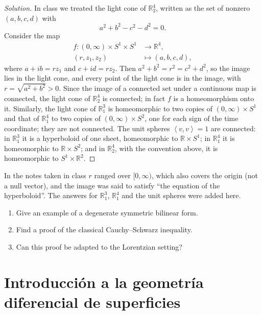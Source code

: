 \begin{proof}[Solution]
In class we treated the light cone of
$\mathbb{R}^4_2$, written as the set of
nonzero $(a,b,c,d)$ with
$$
a^2+b^2-c^2-d^2=0 .
$$
Consider the map
$$
\begin{aligned}
f\colon (0,\infty)\times S^1\times S^1
&\longrightarrow\mathbb{R}^4,\\
(r,z_1,z_2)&\longmapsto(a,b,c,d),
\end{aligned}
$$
where $a+ib=rz_1$ and $c+id=rz_2$. Then
$a^2+b^2=r^2=c^2+d^2$, so the image lies in
the light cone, and every point of the
light cone is in the image, with
$r=\sqrt{a^2+b^2}>0$. Since the image of a
connected set under a continuous map is
connected, the light cone of
$\mathbb{R}^4_2$ is connected; in fact $f$
is a homeomorphism onto it. Similarly, the
light cone of $\mathbb{R}^3_1$ is
homeomorphic to two copies of
$(0,\infty)\times S^1$ and that of
$\mathbb{R}^4_1$ to two copies of
$(0,\infty)\times S^2$, one for each sign
of the time coordinate; they are not
connected. The unit spheres
$\left\langle{} v,v \right\rangle{}=1$ are
connected: in $\mathbb{R}^3_1$ it is a
hyperboloid of one sheet, homeomorphic to
$\mathbb{R}\times S^1$; in
$\mathbb{R}^4_1$ it is homeomorphic to
$\mathbb{R}\times S^2$; and in
$\mathbb{R}^4_2$, with the convention above,
it is homeomorphic to
$S^1\times\mathbb{R}^2$.
\end{proof}

In the notes taken in class $r$ ranged
over $[0,\infty)$, which also covers the
origin (not a null vector), and the image
was said to satisfy ``the equation of the
hyperboloid''. The answers for
$\mathbb{R}^3_1$, $\mathbb{R}^4_1$ and the
unit spheres were added here.

\begin{exercise}[Homework]
\label{exercise-palmas-cauchy-schwarz}
\begin{enumerate}
\item Give an example of a degenerate
symmetric bilinear form.
\item Find a proof of the classical
Cauchy--Schwarz inequality.
\item Can this proof be adapted to the
Lorentzian setting?
\end{enumerate}
\end{exercise}

\section{Introducción a la geometría
diferencial de superficies}
\label{section-garcia-surfaces}

